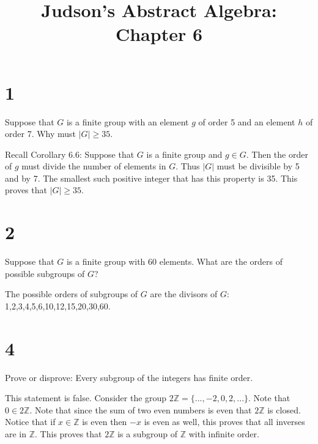 \documentclass[a4paper]{article}
\title{Judson's Abstract Algebra: Chapter 6}
\date{}
\begin{document}
\maketitle

\section*{1}

Suppose that $G$ is a finite group with an element $g$ of order 5 and an element $h$ of order 7. Why must $|G| \geq 35$.

\vspace{\baselineskip}

Recall Corollary 6.6: Suppose that $G$ is a finite group and $g \in G$. Then the order of $g$ must divide the number of elements in $G$. Thus $|G|$ must be divisible by 5 and by 7. The smallest such positive integer that has this property is 35. This proves that $|G| \geq 35$.


\section*{2}

Suppose that $G$ is a finite group with 60 elements. What are the orders of possible subgroups of $G$?

\vspace{\baselineskip}

The possible orders of subgroups of $G$ are the divisors of $G$: 1,2,3,4,5,6,10,12,15,20,30,60.


\section*{4}

Prove or disprove: Every subgroup of the integers has finite order.

\vspace*{\baselineskip}

This statement is false. Consider the group $2\mathbb{Z} = \{ ..., -2, 0, 2, ... \}$. Note that $0 \in 2\mathbb{Z}$. Note that since the sum of two even numbers is even that $2\mathbb{Z}$ is closed. Notice that if $x \in \mathbb{Z}$ is even then $-x$ is even as well, this proves that all inverses are in $\mathbb{Z}$. This proves that $2\mathbb{Z}$ is a subgroup of $\mathbb{Z}$ with infinite order.
\end{document}
